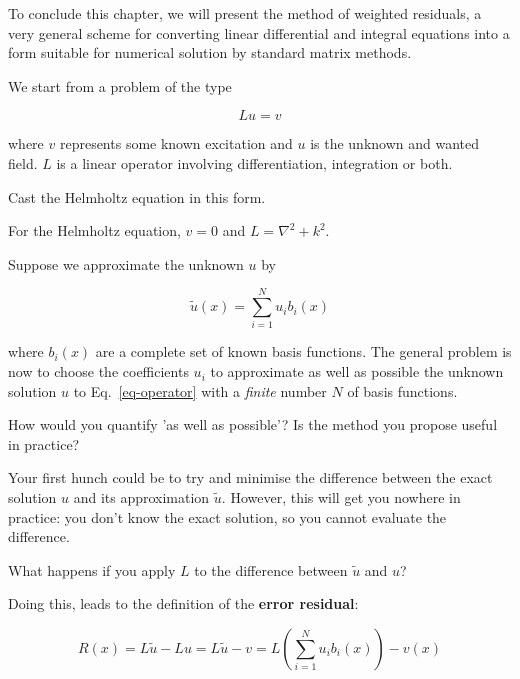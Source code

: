 To conclude this chapter, we will present the method of weighted residuals, a very general scheme for converting linear differential and integral equations into a form suitable for numerical solution by standard matrix methods.


We start from a problem of the type

\begin{equation}
L u = v \label{eq-operator}
\end{equation}

where $v$ represents some known excitation and $u$ is the unknown and wanted field. $L$ is a linear operator involving differentiation, integration or both.

\begin{cue}
Cast the Helmholtz equation in this form.  
\end{cue}

For the Helmholtz equation, $v=0$ and $L=\nabla^2 + k^2$. 

Suppose we approximate the unknown $u$ by

\begin{equation}
\tilde{u}(x) = \sum_{i=1}^N u_i b_i(x) \label{eq-expansion}
\end{equation} 

where $b_i(x)$ are a complete set of known basis functions. The general problem is now to choose the coefficients $u_i$ to approximate as well as possible the unknown solution $u$ to Eq.~\ref{eq-operator} with a \emph{finite} number $N$ of basis functions.

\begin{cue}
How would you quantify 'as well as possible'? Is the method you propose useful in practice?  
\end{cue}

Your first hunch could be to try and minimise the difference between the exact solution $u$ and its approximation $\tilde{u}$. However, this will get you nowhere in practice: you don't know the exact solution, so you cannot evaluate the difference.

\begin{cue}
What happens if you apply $L$ to the difference between $\tilde{u}$ and $u$? 
\end{cue}

Doing this, leads to the definition of the \textbf{error residual}:

\begin{equation}
R(x) = L\tilde{u} - Lu = L\tilde{u} - v = L \left( \sum_{i=1}^N u_i b_i(x) \right) - v(x)
\end{equation} 


